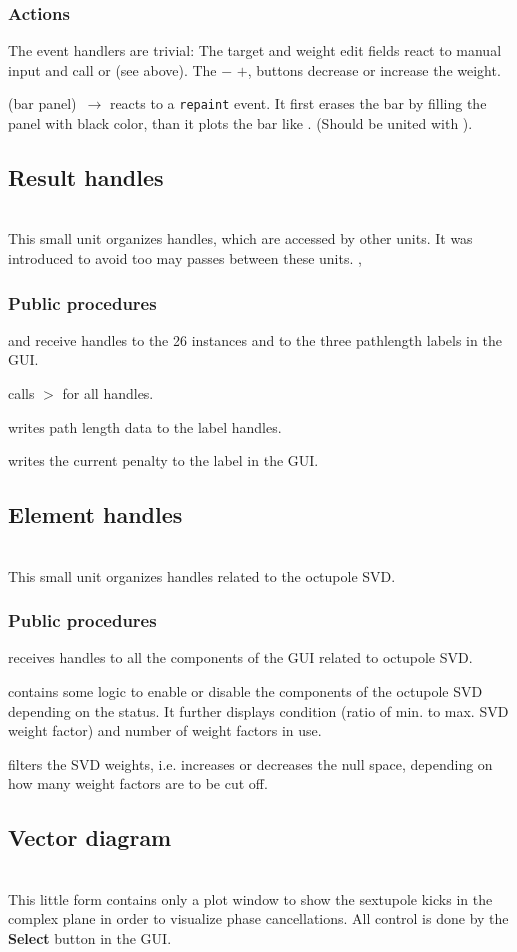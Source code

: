 \documentclass[12pt]{article}
\newcommand\code[1]{{\tt #1}}
\newcommand{\ofld}[1]{\colorbox{black!15}{{{\color{black}\bf #1}}}}
\newcommand{\ofldx}[1]{\colorbox{black!15}{{\color{black}(#1)}}}
\newcommand\guifco[1]{{\color{violet}\code{#1}}}
\newcommand{\unico}[1]{{\color{burntorange}\code{#1}}}
\newcommand{\evcodxf}[2]{\ofldx{#1}~$\rightarrow$ \guifco{#2}}
\newcommand{\gfcod}[2]{\opaguif{#1}$>$\guifco{#2}}
\newcommand{\opagui}[1]{\colorbox{blue!20}{{\color{black}\code{#1}}}}
\newcommand{\oguih}[2]{\subsection{\label{#2}#1}{\Huge\opagui{#2}}\\}
\newcommand{\ogui}[1]{\hyperref[#1]{\opagui{#1}}}
\newcommand{\opaguif}[1]{\colorbox{violet!30}{{\color{black}\code{#1}}}}
\newcommand{\oguif}[1]{\hyperref[#1]{\opaguif{#1}}}
\newcommand{\opauni}[1]{\colorbox{orange!30}{{\color{black}\code{#1}}}}
\newcommand{\ounih}[2]{\subsection{\label{#2}#1}{\Huge\opauni{#2}}\\}
\newcommand{\ouni}[1]{\hyperref[#1]{\opauni{#1}}}
\newcommand{\uses}[1]{\flushleft {\bf Uses:} #1}
\newcommand{\desc}[1]{#1}
\newcommand{\act}[1]{\subsubsection*{Actions} #1}
\newcommand{\ppro}[1]{\subsubsection*{Public procedures} #1}
\newcommand{\todo}[1]{{\color{red} #1}}
\begin{document}
\act{
The event handlers are trivial: The target and weight edit fields react to manual input and call \guifco{UpdateTarget} or \guifco{UpdateWeight} (see above). The \ofld{$-$} \ofld{$+$}, buttons decrease or increase the weight.

\evcodxf{bar panel}{PanBarPaint} reacts to a \code{repaint} event. It first erases the bar by filling the panel with black color, than it plots the bar like \guifco{PlotBar}. \todo{(Should be united with \guifco{PlotBar})}.

}


\ounih{Result handles}{chromreslib} 

\desc{This small unit organizes handles, which are accessed by other units. It was introduced to avoid too may passes between these units.}
\uses{
\oguif{chamframe}, \ouni{chromlib}
}
\ppro{
\unico{Pass\_CH\_Handles} and \unico{Pass\_LabPath\_Handles} receive handles to the 26 \guifco{chamframe} instances and to the three pathlength labels in the \ogui{opachroma} GUI.

\unico{UpdateHamilton} calls \gfcod{chamframe}{UpdateHam} for all handles.

\unico{UpdatePath} writes path length data to the label handles.

\unico{UpdatePenalty} writes the current penalty to the label in the \ogui{opachroma} GUI.
}

\ounih{Element handles}{chromelelib} 

\desc{This small unit organizes handles related to the octupole SVD.
}
\uses{ \ouni{chromlib} }
\ppro{
\unico{Pass\_Osvd\_Handles} receives handles to all the components of the \ogui{opachroma} GUI related to octupole SVD.

\unico{Osvd\_Status} contains some logic to enable or disable the components of the octupole SVD depending on the status. It further displays condition (ratio of min. to max. SVD weight factor) and number of weight factors in use.

\unico{Osvd\_Wfilter} filters the SVD weights, i.e. increases or decreases the null space, depending on how many weight factors are to be cut off.

}


\oguih{Vector diagram}{ochromsvector} 

\desc{This little form contains only a plot window to show the sextupole kicks in the complex plane in order to visualize phase cancellations. All control is done by the \ofld{Select} button in the \ogui{opachroma} GUI.}
\end{document}
